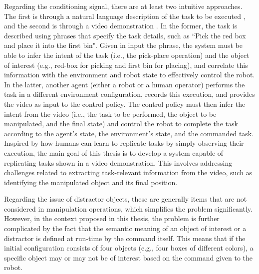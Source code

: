 Regarding the conditioning signal, there are at least two intuitive approaches. The first is through a natural language description of the task to be executed \cite{stepputtis2020language,mees2022calvin,brohan2022rt}, and the second is through a video demonstration \cite{dasari2021transformers_one_shot,mandi2022towards_more_generalizable_one_shot}. 
In the former, the task is described using phrases that specify the task details, such as ``Pick the red box and place it into the first bin". Given in input the phrase, the system must be able to infer the intent of the task (i.e., the pick-place operation) and the object of interest (e.g., red-box for picking and first bin for placing), and correlate this information with the environment and robot state to effectively control the robot.
In the latter, another agent (either a robot or a human operator) performs the task in a different environment configuration, records this execution, and provides the video as input to the control policy. The control policy must then infer the intent from the video (i.e., the task to be performed, the object to be manipulated, and the final state) and control the robot to complete the task according to the agent's state, the environment's state, and the commanded task.
Inspired by how humans can learn to replicate tasks by simply observing their execution, the main goal of this thesis is to develop a system capable of replicating tasks shown in a video demonstration. This involves addressing challenges related to extracting task-relevant information from the video, such as identifying the manipulated object and its final position.

Regarding the issue of distractor objects, these are generally items that are not considered in manipulation operations, which simplifies the problem significantly. However, in the context proposed in this thesis, the problem is further complicated by the fact that the semantic meaning of an object of interest or a distractor is defined at run-time by the command itself. This means that if the initial configuration consists of four objects (e.g., four boxes of different colors), a specific object may or may not be of interest based on the command given to the robot.

